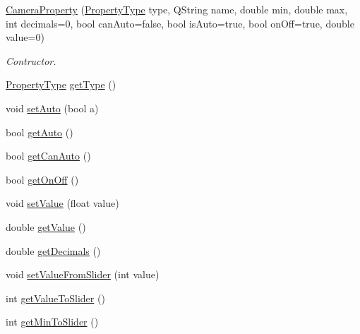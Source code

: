 \begin{DoxyCompactItemize}
\item 
\mbox{\hyperlink{class_camera_manager_1_1_camera_property_a7f096010f1d8c0cb5a0b7e3c592196a6}{Camera\+Property}} (\mbox{\hyperlink{namespace_camera_manager_a91c5befa73ac521c804690839ad888ab}{Property\+Type}} type, Q\+String name, double min, double max, int decimals=0, bool can\+Auto=false, bool is\+Auto=true, bool on\+Off=true, double value=0)
\begin{DoxyCompactList}\small\item\em Contructor. \end{DoxyCompactList}\item 
\mbox{\hyperlink{namespace_camera_manager_a91c5befa73ac521c804690839ad888ab}{Property\+Type}} \mbox{\hyperlink{class_camera_manager_1_1_camera_property_abba29ee03832b7036f2d828223a5e26d}{get\+Type}} ()
\item 
void \mbox{\hyperlink{class_camera_manager_1_1_camera_property_a3c86a53f13aff002234e1c2e7ba17e22}{set\+Auto}} (bool a)
\item 
bool \mbox{\hyperlink{class_camera_manager_1_1_camera_property_a09276d4af15cb3b6b282d75108eefc2c}{get\+Auto}} ()
\item 
bool \mbox{\hyperlink{class_camera_manager_1_1_camera_property_a79acdab6a37d6c8c07d2fc46cfee8067}{get\+Can\+Auto}} ()
\item 
bool \mbox{\hyperlink{class_camera_manager_1_1_camera_property_a9e78cc25ce3d0a22429852c3b6b4007d}{get\+On\+Off}} ()
\item 
void \mbox{\hyperlink{class_camera_manager_1_1_camera_property_aabbcf30d6a190b57e87f9b5249a7614d}{set\+Value}} (float value)
\item 
double \mbox{\hyperlink{class_camera_manager_1_1_camera_property_ac01056c2c3edb087f186fc279b4c40d6}{get\+Value}} ()
\item 
double \mbox{\hyperlink{class_camera_manager_1_1_camera_property_a1e93325c345214a7eee443ef7702fcc9}{get\+Decimals}} ()
\item 
void \mbox{\hyperlink{class_camera_manager_1_1_camera_property_aebccd803702e01dbd9418b0ed4efba9a}{set\+Value\+From\+Slider}} (int value)
\item 
int \mbox{\hyperlink{class_camera_manager_1_1_camera_property_aa07b5e54635ea946dde8e5e3407c38d8}{get\+Value\+To\+Slider}} ()
\item 
int \mbox{\hyperlink{class_camera_manager_1_1_camera_property_a8680d2fcb0b57d832d7c13065320439f}{get\+Min\+To\+Slider}} ()
\item 

\end{DoxyCompactItemize}
